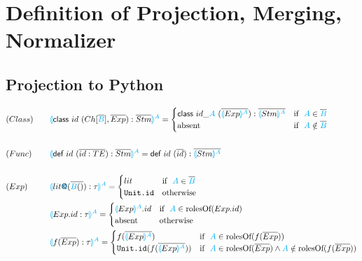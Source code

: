 \documentclass{thesis}
\newcommand{\projection}[2]{{\color{cyan}\llparenthesis}#1{\color{cyan}\rrparenthesis^#2}}
\newcommand{\mblue}[1]{\textbf{\textsf{\color{MidnightBlue}#1}}}
\newcommand{\cyan}[1]{\color{cyan}#1}
\begin{document}
\chapter{Definition of Projection, Merging, Normalizer}
\section{Projection to Python}

\begin{alignat*}{2}
  &(Class)~~~ &&\projection{\textsf{class} ~id~(Ch[\overline{\cyan{B}}],\overline{Exp}):\overline{Stm}}{A}=
  \begin{cases}
    \textsf{class} ~id\_{\cyan{A}}~(\overline{\projection{Exp}{A}}):\overline{\projection{Stm}{A}} & \text{if}~~ {\cyan{A}} \in \overline{\cyan{B}}\\
    \text{absent} & \text{if}~~ {\cyan{A}} \notin \overline{\cyan{B}}
  \end{cases}\\
  \\
  &(Func)~~~ &&\projection{\textsf{def} ~id~(\overline{id:TE}):\overline{Stm}}{A} = \textsf{def} ~id~ (\overline{id}):\overline{\projection{Stm}{A}}\\
  \\
  &(Exp)~~~ &&\projection{lit\mblue{@}(\overline{{\color{cyan}{B}}()}):\tau}{A}=
  \begin{cases}
    lit & \text{if}~~ {\color{cyan}A} \in \overline{\color{cyan}{B}}\\
    \texttt{Unit.id} &\text{otherwise}
  \end{cases}\\
  &&&\projection{Exp.id:\tau}{A}=
  \begin{cases}
    \projection{Exp}{A}.id &\text{if}~~{\color{cyan}A} \in \text{rolesOf} (Exp.id)\\
    \text{absent} &\text{otherwise}
  \end{cases}\\
  &&&\projection{f(\overline{Exp}):\tau}{A} =
  \begin{cases}
    f(\overline{\projection{Exp}{A}}) &\text{if}~~ {\color{cyan}A} \in \text{rolesOf} (f(\overline{Exp}))\\
    \texttt{Unit.id}(f(\overline{\projection{Exp}{A}})) &\text{if}~~ {\color{cyan}A} \in \text{rolesOf}(\overline{Exp}) \wedge {\color{cyan}A} \notin \text{rolesOf} (f(\overline{Exp}))\\

\end{cases}
\end{alignat*}
\end{document}
